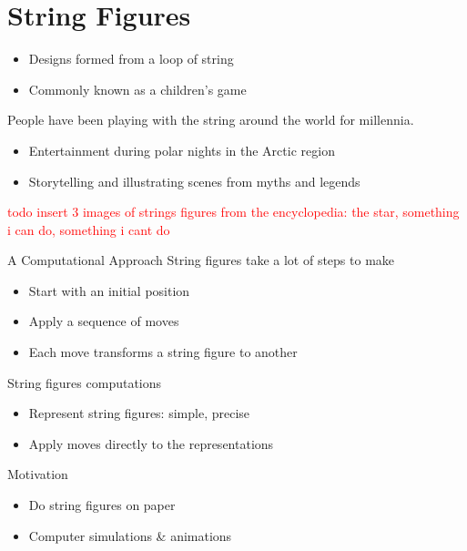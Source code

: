 \section{String Figures}

\begin{frame}{\secname}
\begin{itemize}
    \item Designs formed from a loop of string
    \item Commonly known as a children's game
\end{itemize}

\pause People have been playing with the string around the world for millennia.

\begin{itemize}[<+(1)->]
    \item  Entertainment during polar nights in the Arctic region
    \item  Storytelling and illustrating scenes from myths and legends
\end{itemize}

\textcolor{red}{todo insert 3 images of strings figures from the encyclopedia: the star, something i can do, something i cant do}
\end{frame}



\begin{frame}{A Computational Approach}
String figures take a lot of steps to make

\begin{itemize}[<+(1)->]
    \item  Start with an initial position
    \item  Apply a sequence of moves
    \item  Each move transforms a string figure to another
\end{itemize}

\pause String figures computations

\begin{itemize}[<+(1)->]
    \item  Represent string figures: simple, precise
    \item  Apply moves directly to the representations
\end{itemize}

\pause Motivation

\begin{itemize}[<+(1)->]
    \item Do string figures on paper
    \item Computer simulations \& animations
\end{itemize}

\end{frame}

